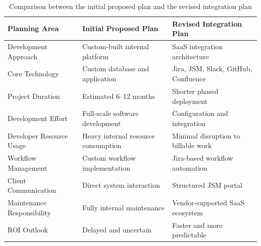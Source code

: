 \documentclass[12pt,a4paper]{report}
\begin{document}
\begin{table}[H]
\centering
\renewcommand{\arraystretch}{1.35}
\small
\begin{tabularx}{\textwidth}{|p{4cm}|X|X|}
\hline
\rowcolor{secondary}
\textbf{Planning Area} & \textbf{Initial Proposed Plan} & \textbf{Revised Integration Plan} \\
\hline
Development Approach & Custom-built internal platform & SaaS integration architecture \\
\hline
Core Technology & Custom database and application & Jira, JSM, Slack, GitHub, Confluence \\
\hline
Project Duration & Estimated 6--12 months & Shorter phased deployment \\
\hline
Development Effort & Full-scale software development & Configuration and integration \\
\hline
Developer Resource Usage & Heavy internal resource consumption & Minimal disruption to billable work \\
\hline
Workflow Management & Custom workflow implementation & Jira-based workflow automation \\
\hline
Client Communication & Direct system interaction & Structured JSM portal \\
\hline
Maintenance Responsibility & Fully internal maintenance & Vendor-supported SaaS ecosystem \\
\hline
ROI Outlook & Delayed and uncertain & Faster and more predictable \\
\hline
\end{tabularx}
\caption{Comparison between the initial proposed plan and the revised integration plan}
\end{table}
\end{document}
